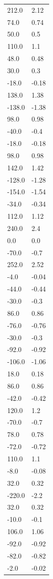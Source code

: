 \begin{longtable}{ll}
212.0 & 2.12 \\
74.0 & 0.74 \\
50.0 & 0.5 \\
110.0 & 1.1 \\
48.0 & 0.48 \\
30.0 & 0.3 \\
-18.0 & -0.18 \\
138.0 & 1.38 \\
-138.0 & -1.38 \\
98.0 & 0.98 \\
-40.0 & -0.4 \\
-18.0 & -0.18 \\
98.0 & 0.98 \\
142.0 & 1.42 \\
-128.0 & -1.28 \\
-154.0 & -1.54 \\
-34.0 & -0.34 \\
112.0 & 1.12 \\
240.0 & 2.4 \\
0.0 & 0.0 \\
-70.0 & -0.7 \\
252.0 & 2.52 \\
-4.0 & -0.04 \\
-44.0 & -0.44 \\
-30.0 & -0.3 \\
86.0 & 0.86 \\
-76.0 & -0.76 \\
-30.0 & -0.3 \\
-92.0 & -0.92 \\
-106.0 & -1.06 \\
18.0 & 0.18 \\
86.0 & 0.86 \\
-42.0 & -0.42 \\
120.0 & 1.2 \\
-70.0 & -0.7 \\
78.0 & 0.78 \\
-72.0 & -0.72 \\
110.0 & 1.1 \\
-8.0 & -0.08 \\
32.0 & 0.32 \\
-220.0 & -2.2 \\
32.0 & 0.32 \\
-10.0 & -0.1 \\
106.0 & 1.06 \\
-92.0 & -0.92 \\
-82.0 & -0.82 \\
-2.0 & -0.02 \\

\end{longtable}

